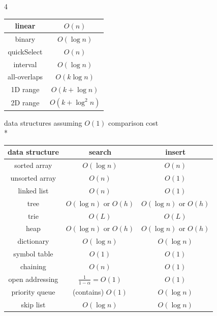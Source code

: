 \documentclass[fontsize=6pt, landscape, a4paper]{scrartcl}
\newenvironment{tightcenter}{%
  \setlength\topsep{0pt}
  \setlength\parskip{0pt}
  \begin{center}
}{%
  \end{center}
}
\begin{document}
\begin{multicols*}{4}
\begin{tightcenter}
\begin{tabular}{| c | c |}
            linear          & $O(n)$              \\\hline
            binary          & $O(\log n)$         \\\hline
            quickSelect     & $O(n)$              \\\hline
            interval        & $O(\log n)$         \\\hline
            all-overlaps    & $O(k\log n)$        \\\hline
            1D range        & $O(k + \log n)$     \\\hline
            2D range        & $O(k + \log^{2} n)$ \\\hline
        \end{tabular}

        data structures assuming $O(1)$ comparison cost \\*
        \begin{tabular}{| c | c | c |}\hline
            \textbf{data structure} & \textbf{search}                                  & \textbf{insert}       \\\hline
            sorted array            & $O(\log n)$                                      & $O(n)$                \\\hline
            unsorted array          & $O(n)$                                           & $O(1)$                \\\hline
            linked list             & $O(n)$                                           & $O(1)$                \\\hline
            tree                    & $O(\log n)$ or $O(h)$                            & $O(\log n)$ or $O(h)$ \\\hline
            trie                    & $O(L)$                                           & $O(L)$                \\\hline
            heap                    & $O(\log n)$ or $O(h)$                            & $O(\log n)$ or $O(h)$ \\\hline
            dictionary              & $O(\log n)$                                      & $O(\log n)$           \\\hline
            symbol table            & $O(1)$                                           & $O(1)$                \\\hline
            chaining                & $O(n)$                                           & $O(1)$                \\\hline
            open addressing         & \multicolumn{1}{c|}{$\frac{1}{1-\alpha} = O(1)$} & $O(1)$                \\\hline
            priority queue          & (contains) $O(1)$                                & $O(\log n)$           \\\hline
            skip list               & $O(\log n)$                                      & $O(\log n)$           \\\hline
        \end{tabular}


\end{tightcenter}
\end{multicols*}
\end{document}
